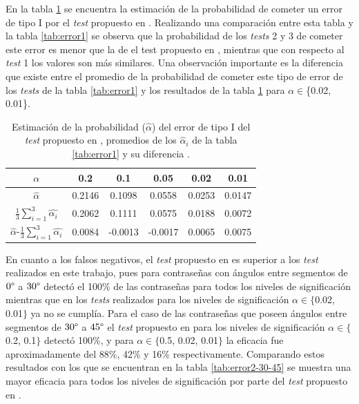 \documentclass[12pt]{report}
\begin{document}
En la tabla \ref{tab:erro1-sensor} se encuentra la estimación de la probabilidad de cometer un error de tipo I por el \textit{test} propuesto en \cite{13}. Realizando una comparación entre esta tabla y la tabla \ref{tab:error1} se observa que la probabilidad de los \textit{tests} 2 y 3 de cometer este error es menor que la de el test propuesto en \cite{13}, mientras que con respecto al \textit{test} 1 los valores son más similares. Una observación importante es la diferencia que existe entre el promedio de la probabilidad de cometer este tipo de error de los \textit{tests} de la tabla \ref{tab:error1} y los resultados de la tabla \ref{tab:erro1-sensor} para $\alpha \in$\{0.02, 0.01\}.
\begin{table}[h!]
	\centering
	\begin{tabular}{|c|ccccc|}
		\hline
		$\alpha$ &  0.2 & 0.1 & 0.05 & 0.02 & 0.01 \\
		\hline
		$\hat{\alpha}$ & 0.2146 & 0.1098 & 0.0558 & 0.0253 & 0.0147 \\
		$\frac{1}{3} \sum_{i=1}^{3} \hat{\alpha_i}$		
		&0.2062	&	0.1111	&	0.0575	&	0.0188	&0.0072	\\	
		\hline
		$\hat{\alpha}$-$\frac{1}{3} \sum_{i=1}^{3} \hat{\alpha_i}$ & 0.0084  & -0.0013 &  -0.0017 &0.0065  &  0.0075 \\
		\hline
	\end{tabular}
	\caption{Estimación de la probabilidad ($\hat{\alpha}$) del error de tipo I del \textit{test} propuesto en \cite{13}, promedios de los $\hat{\alpha}_i$ de la tabla \ref{tab:error1} y su diferencia .}
	\label{tab:erro1-sensor}
\end{table}

En cuanto a los falsos negativos, el \textit{test} propuesto en \cite{13} es superior a los \textit{test} realizados en este trabajo, pues para contraseñas con ángulos entre segmentos de  $0\degree$ a $30\degree$ detectó el 100\% de las contraseñas para todos los niveles de significación mientras que en los \textit{tests} realizados para los niveles de significación  $\alpha \in \{$0.02, 0.01$\}$ ya no se cumplía. Para el caso de las contraseñas que poseen ángulos entre segmentos de $30\degree$ a $45\degree$ el \textit{test} propuesto en \cite{13} para los niveles de significación $\alpha \in \{$0.2, 0.1$\}$ detectó 100\%, y para $\alpha \in \{$0.5, 0.02, 0.01$\}$ la eficacia fue aproximadamente  del 88\%, 42\% y 16\% respectivamente. Comparando estos resultados con los que se encuentran en la tabla \ref{tab:error2-30-45} se muestra una mayor eficacia para todos los niveles de significación por parte del \textit{test} propuesto en \cite{13}.
\end{document}
